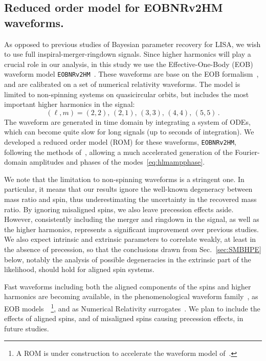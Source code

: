 \documentclass[aps,showpacs,twocolumn,prd,superscriptaddress,nofootinbib]{revtex4-1}
\newcommand{\be}{\begin{equation}}
\newcommand{\ee}{\end{equation}}
\begin{document}

\subsection{Reduced order model for EOBNRv2HM waveforms.}
\label{subsec:ROM}

As opposed to previous studies of Bayesian parameter recovery for LISA, we wish to use full inspiral-merger-ringdown signals. Since higher harmonics will play a crucial role in our analysis, in this study we use the Effective-One-Body (EOB) waveform model \texttt{EOBNRv2HM}~\cite{Pan+11}. These waveforms are base on the EOB formalism~\cite{BD99, BD00}, and are calibrated on a set of numerical relativity waveforms. The model is limited to non-spinning systems on quasicircular orbits, but includes the most important higher harmonics in the signal:
\be
	(\ell, m) = (2,2) ,\, (2,1) ,\, (3,3) ,\, (4,4) ,\, (5,5) \,.
\ee
The waveform are generated in time domain by integrating a system of ODEs, which can become quite slow for long signals (up to seconds of integration). We developed a reduced order model (ROM) for these waveforms, \texttt{EOBNRv2HM}, following the methods of~\cite{Puerrer14}, allowing a much accelerated generation of the Fourier-domain amplitudes and phases of the modes~\eqref{eq:hlmampphase}. 

We note that the limitation to non-spinning waveforms is a stringent one. In particular, it means that our results ignore the well-known degeneracy between mass ratio and spin, thus underestimating the uncertainty in the recovered mass ratio. By ignoring misaligned spins, we also leave precession effects aside. However, consistently including the merger and ringdown in the signal, as well as the higher harmonics, represents a significant improvement over previous studies. We also expect intrinsic and extrinsic parameters to correlate weakly, at least in the absence of precession, so that the conclusions drawn from Sec.~\ref{sec:SMBHPE} below, notably the analysis of possible degeneracies in the extrinsic part of the likelihood, should hold for aligned spin systems.

Fast waveforms including both the aligned components of the spins and higher harmonics are becoming available, in the phenomenological waveform family~\cite{London+17}, as EOB models~\cite{Cotesta+18}~\footnote{A ROM is under construction to accelerate the waveform model of~\cite{Cotesta+18}.}, and as Numerical Relativity surrogates~\cite{Varma+18}. We plan to include the effects of aligned spins, and of misaligned spins causing precession effects, in future studies.
\end{document}
